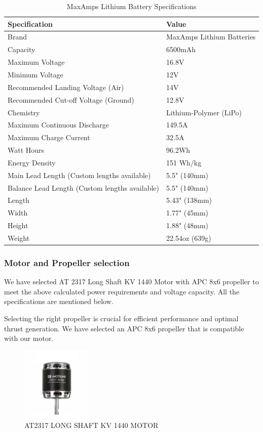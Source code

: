 \documentclass[12 pt]{article}
\begin{document}
\begin{table}[h]
    \centering
    \caption{MaxAmps Lithium Battery Specifications}
    \begin{tabular}{|l|l|}
    \hline
    \textbf{Specification} & \textbf{Value} \\ \hline
    Brand & MaxAmps Lithium Batteries \\
    Capacity & 6500mAh \\
    Maximum Voltage & 16.8V \\
    Minimum Voltage & 12V \\
    Recommended Landing Voltage (Air) & 14V \\
    Recommended Cut-off Voltage (Ground) & 12.8V \\
    Chemistry & Lithium-Polymer (LiPo) \\
    Maximum Continuous Discharge & 149.5A \\
    Maximum Charge Current & 32.5A \\
    Watt Hours & 96.2Wh \\
    Energy Density & 151 Wh/kg \\
    Main Lead Length (Custom lengths available) & 5.5" (140mm) \\
    Balance Lead Length (Custom lengths available) & 5.5" (140mm) \\
    Length & 5.43" (138mm) \\
    Width & 1.77" (45mm) \\
    Height & 1.88" (48mm) \\
    Weight & 22.54oz (639g) \\ \hline
    \end{tabular}
\end{table}

\subsubsection{Motor and Propeller selection}

We have selected AT 2317 Long Shaft KV 1440 Motor with APC 8x6 propeller to meet the above calculated power requirements and voltage capacity. All the specifications are mentioned below.

Selecting the right propeller is crucial for efficient performance and optimal thrust generation. We have selected an APC 8x6 propeller that is compatible with our motor.\\

\begin{figure}[h]
    \centering
    \includegraphics[width=0.3\textwidth]{motorr.jpg}
    \caption{AT2317 LONG SHAFT KV 1440 MOTOR}
    \label{fig:motor}
\end{figure}
\end{document}
